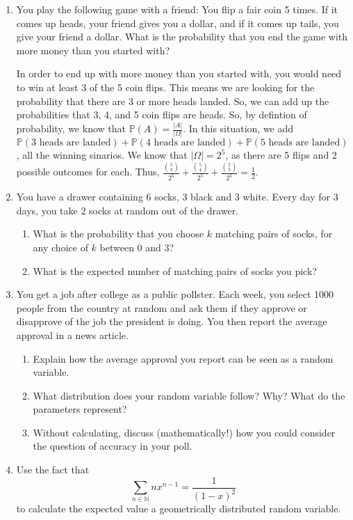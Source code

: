 \documentclass[12pt]{article}
\newcommand{\N}{\mathbb{N}}
\renewcommand{\P}{\mathbb{P}}
\newcommand{\p}[1]{\P\left(#1\right)}
\begin{document}
\begin{enumerate}
\item You play the following game with a friend: You flip a fair coin 5 times. If it comes up heads, your friend gives you a dollar, and if it comes up tails, you give your friend a dollar. What is the probability that you end the game with more money than you started with?

In order to end up with more money than you started with, you would need to win at least 3 of the 5 coin flips. This means we are looking for the probability that there are 3 or more heads landed. So, we can add up the probabilities that 3, 4, and 5 coin flips are heads. So, by defintion of probability, we know that $\p{A} = \frac{|A|}{|\Omega|}$. In this situation, we add $\p{\text{3 heads are landed}} + \p{\text{4 heads are landed}} + \p{\text{5 heads are landed}}$, all the winning sinarios. We know that $|\Omega| = 2^5$, as there are 5 flips and 2 possible outcomes for each. Thus, $\frac{\binom{5}{3}}{2^{5}} + \frac{\binom{5}{4}}{2^{5}} + \frac{\binom{5}{5}}{2^{5}} = \frac{1}{2}$.

\item You have a drawer containing 6 socks, 3 black and 3 white. Every day for 3 days, you take 2 socks at random out of the drawer.
\begin{enumerate}
\item  What is the probability that you choose $k$ matching pairs of socks, for any choice of $k$ between 0 and 3?
\item What is the expected number of matching pairs of socks you pick?
\end{enumerate}

\item You get a job after college as a public pollster. Each week, you select 1000 people from the country at random and ask them if they approve or disapprove of the job the president is doing. You then report the average approval in a news article.
\begin{enumerate}
\item Explain how the average approval you report can be seen as a random variable.
\item What distribution does your random variable follow? Why? What do the parameters represent?
\item Without calculating, discuss (mathematically!) how you could consider the question of accuracy in your poll.
\end{enumerate}

\item Use the fact that 
\[\sum_{n\in\N} nx^{n-1} = \frac{1}{(1-x)^2}\]
to calculate the expected value a geometrically distributed random variable.


\end{enumerate}
\end{document}

